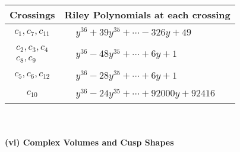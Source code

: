 \documentclass[1p]{elsarticle_modified}
\theoremstyle{definition}
\begin{document}
\begin{tabular}{m{50pt}|m{274pt}}
Crossings & \hspace{64pt}Riley Polynomials at each crossing \\
\hline $$\begin{aligned}c_{1},c_{7},c_{11}\end{aligned}$$&$\begin{aligned}
&y^{36}+39 y^{35}+\cdots-326 y+49
\end{aligned}$\\
\hline $$\begin{aligned}c_{2},c_{3},c_{4}\\c_{8},c_{9}\end{aligned}$$&$\begin{aligned}
&y^{36}-48 y^{35}+\cdots+6 y+1
\end{aligned}$\\
\hline $$\begin{aligned}c_{5},c_{6},c_{12}\end{aligned}$$&$\begin{aligned}
&y^{36}-28 y^{35}+\cdots+6 y+1
\end{aligned}$\\
\hline $$\begin{aligned}c_{10}\end{aligned}$$&$\begin{aligned}
&y^{36}-24 y^{35}+\cdots+92000 y+92416
\end{aligned}$\\
\hline
\end{tabular}\\~\\
\newpage\flushleft \textbf{(vi) Complex Volumes and Cusp Shapes}
\end{document}
